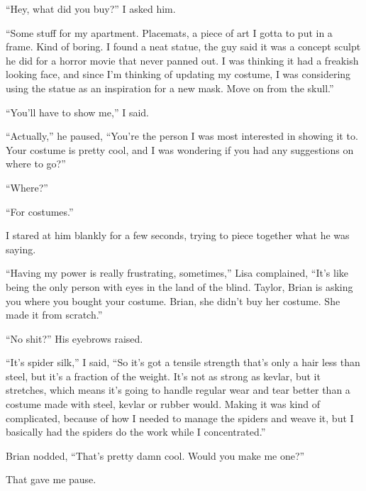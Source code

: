 ``Hey, what did you buy?'' I asked him.



``Some stuff for my apartment.  Placemats, a piece of art I gotta to put in a frame.  Kind of boring.  I found a neat statue, the guy said it was a concept sculpt he did for a horror movie that never panned out.  I was thinking it had a freakish looking face, and since I'm thinking of updating my costume, I was considering using the statue as an inspiration for a new mask.  Move on from the skull.''



``You'll have to show me,'' I said.



``Actually,'' he paused, ``You're the person I was most interested in showing it to.  Your costume is pretty cool, and I was wondering if you had any suggestions on where to go?''



``Where?''



``For costumes.''



I stared at him blankly for a few seconds, trying to piece together what he was saying.



``Having my power is really frustrating, sometimes,'' Lisa complained, ``It's like being the only person with eyes in the land of the blind.  Taylor, Brian is asking you where you bought your costume.  Brian, she didn't buy her costume.  She made it from scratch.''



``No shit?'' His eyebrows raised.



``It's spider silk,'' I said, ``So it's got a tensile strength that's only a hair less than steel, but it's a fraction of the weight.  It's not as strong as kevlar, but it stretches, which means it's going to handle regular wear and tear better than a costume made with steel, kevlar or rubber would.  Making it was kind of complicated, because of how I needed to manage the spiders and weave it, but I basically had the spiders do the work while I concentrated.''



Brian nodded, ``That's pretty damn cool.  Would you make me one?''



That gave me pause.



